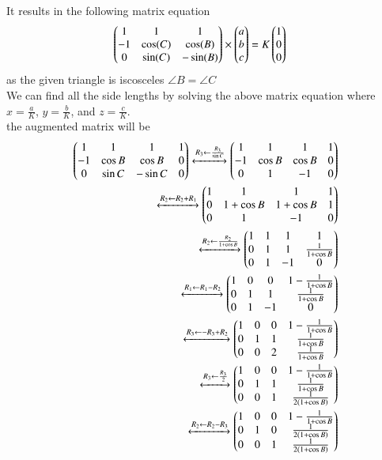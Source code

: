 \documentclass[journal]{IEEEtran}
\begin{document}
It results in the following matrix equation
\begin{align*}
  \begin{pmatrix}1 & 1 & 1\\-1 & \cos(C) & \cos(B)\\0 & \sin(C) & -\sin(B)\end{pmatrix}\times\begin{pmatrix}a\\b\\c\end{pmatrix}&=K\begin{pmatrix}1\\0\\0\end{pmatrix}
\end{align*}
as the given triangle is iscosceles $\angle B = \angle C$\\
We can find all the side lengths by solving the above matrix equation where $x=\frac{a}{K}$, $y=\frac{b}{K}$, and $z=\frac{c}{K}$.\\
the augmented matrix will be\\
\begin{align*}
	\begin{pmatrix}1 & 1 & 1 & 1\\ -1 & \cos B & \cos B & 0\\ 0 & \sin C & -\sin C & 0\end{pmatrix}\xleftrightarrow[]{R_3 \leftarrow {\frac{R_3}{\sin C}}}\begin{pmatrix}1 & 1 & 1 & 1\\ -1 & \cos B & \cos B & 0\\ 0 & 1 & -1 & 0\end{pmatrix}\\
	\xleftrightarrow[]{R_2 \leftarrow {R_2+R_1}} \begin{pmatrix}1 & 1 & 1 & 1\\ 0 & 1 + \cos B & 1 + \cos B & 1\\ 0 & 1 & -1 & 0\end{pmatrix}\\
	\xleftrightarrow[]{R_2 \leftarrow {\frac{R_2}{1 + \cos B}}}\begin{pmatrix}1 & 1 & 1 & 1\\ 0 & 1 & 1 & \frac{1}{1 + \cos B}\\ 0 & 1 & -1 & 0\end{pmatrix}\\
	\xleftrightarrow[]{R_1 \leftarrow {R_1-R_2}}\begin{pmatrix}1 & 0 & 0 & 1 - \frac{1}{1 + \cos B}\\ 0 & 1 & 1 & \frac{1}{1 + \cos B}\\0 & 1 & -1 & 0\end{pmatrix}\\
	\xleftrightarrow[]{R_3 \leftarrow {-R_3+R_2}}\begin{pmatrix}1 & 0 & 0 & 1 - \frac{1}{1 + \cos B}\\ 0 & 1 & 1 & \frac{1}{1 + \cos B}\\ 0 & 0 & 2 & \frac{1}{1 + \cos B}\end{pmatrix}\\
	\xleftrightarrow[]{R_3 \leftarrow {\frac{R_3}{2}}}\begin{pmatrix}1 & 0 & 0 & 1 - \frac{1}{1 + \cos B}\\ 0 & 1 & 1 & \frac{1}{1 + \cos B}\\ 0 & 0 & 1 & \frac{1}{2\left(1 + \cos B\right)}\end{pmatrix}\\
	\xleftrightarrow[]{R_2 \leftarrow {R_2-R_3}}\begin{pmatrix}1 & 0 & 0 & 1 - \frac{1}{1+\cos B}\\ 0 & 1 & 0 & \frac{1}{2\left(1 + \cos B\right)}\\ 0 & 0 & 1 & \frac{1}{2\left(1 + \cos B\right)}\end{pmatrix}\\
\end{align*}
\end{document}

